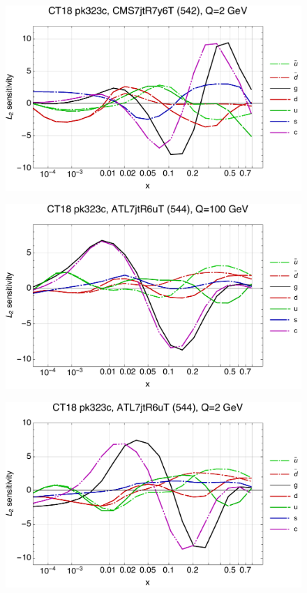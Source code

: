 \documentclass[10pt,aps,prd,floatfix,titlepage]{revtex4}
\begin{document}
\begin{figure}
\includegraphics[width=\textwidth,height=0.44\textheight,keepaspectratio]{1/542_ct18nn_L2_q2_Sf_1.pdf}
\caption{}
\end{figure}
\clearpage
\begin{figure}
\includegraphics[width=\textwidth,height=0.44\textheight,keepaspectratio]{1/544_ct18nn_L2_q100_Sf_1.pdf}
\caption{}
\end{figure}
\begin{figure}
\includegraphics[width=\textwidth,height=0.44\textheight,keepaspectratio]{1/544_ct18nn_L2_q2_Sf_1.pdf}
\caption{}
\end{figure}
\end{document}
